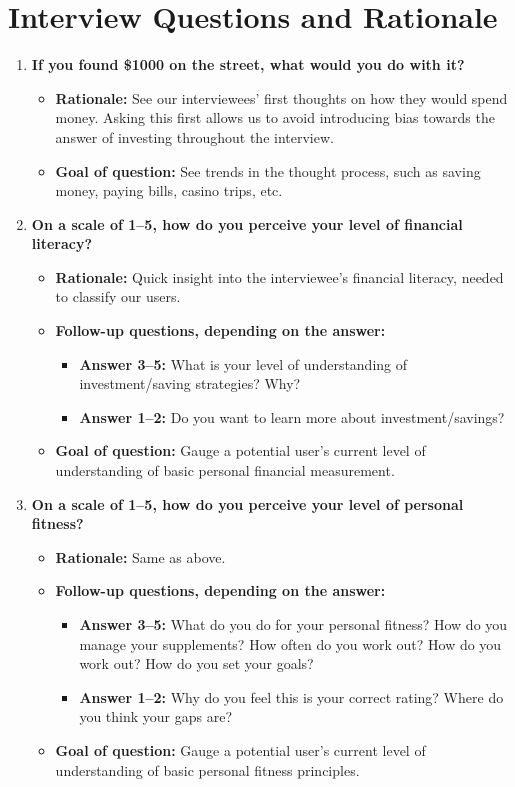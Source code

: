 \documentclass[12pt]{article}
\begin{document}
\section{Interview Questions and Rationale}
\begin{enumerate}

\item \textbf{If you found \$1000 on the street, what would you do with it?}
  \begin{itemize}
    \item \textbf{Rationale:} See our interviewees' first thoughts on how they would spend money. Asking this first allows us to avoid introducing bias towards the answer of investing throughout the interview.
    \item \textbf{Goal of question:} See trends in the thought process, such as saving money, paying bills, casino trips, etc.
  \end{itemize}

\item \textbf{On a scale of 1--5, how do you perceive your level of financial literacy?}
  \begin{itemize}
    \item \textbf{Rationale:} Quick insight into the interviewee's financial literacy, needed to classify our users.
    \item \textbf{Follow-up questions, depending on the answer:}
      \begin{itemize}
        \item \textbf{Answer 3--5:} What is your level of understanding of investment/saving strategies? Why?
        \item \textbf{Answer 1--2:} Do you want to learn more about investment/savings?
      \end{itemize}
    \item \textbf{Goal of question:} Gauge a potential user's current level of understanding of basic personal financial measurement.
  \end{itemize}

\item \textbf{On a scale of 1--5, how do you perceive your level of personal fitness?}
  \begin{itemize}
    \item \textbf{Rationale:} Same as above.
    \item \textbf{Follow-up questions, depending on the answer:}
      \begin{itemize}
        \item \textbf{Answer 3--5:} What do you do for your personal fitness? How do you manage your supplements? How often do you work out? How do you work out? How do you set your goals?
        \item \textbf{Answer 1--2:} Why do you feel this is your correct rating? Where do you think your gaps are?
      \end{itemize}
    \item \textbf{Goal of question:} Gauge a potential user's current level of understanding of basic personal fitness principles.
  \end{itemize}


\end{enumerate}
\end{document}
